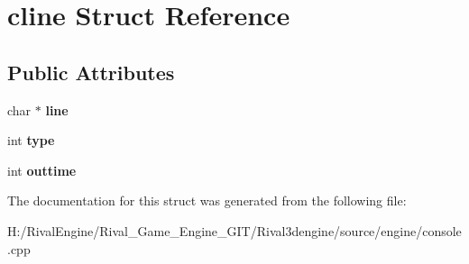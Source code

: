 \hypertarget{structcline}{}\section{cline Struct Reference}
\label{structcline}
\subsection*{Public Attributes}
\begin{DoxyCompactItemize}
\item 
\mbox{\label{structcline_a6693eaa3be2233cab8b591dbe50bc88b}} 
char $\ast$ {\bfseries line}
\item 
\mbox{\label{structcline_aad264f8b9b2cc3e83d5fcd4c6fe77c8e}} 
int {\bfseries type}
\item 
\mbox{\label{structcline_a74149eb862d0b5f130954364ad0bf5f9}} 
int {\bfseries outtime}
\end{DoxyCompactItemize}


The documentation for this struct was generated from the following file\+:\begin{DoxyCompactItemize}
\item 
H\+:/\+Rival\+Engine/\+Rival\+\_\+\+Game\+\_\+\+Engine\+\_\+\+G\+I\+T/\+Rival3dengine/source/engine/console.\+cpp\end{DoxyCompactItemize}
